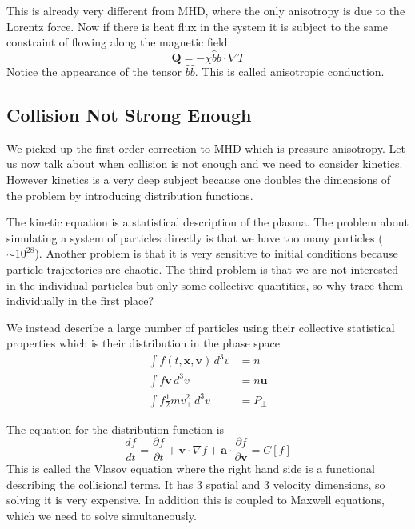 \documentclass[letterpaper, 11pt]{article}
\numberwithin{equation}{section}
\numberwithin{figure}{section}
\begin{document}
This is already very different from MHD, where the only anisotropy is due to the
Lorentz force. Now if there is heat flux in the system it is subject to the same
constraint of flowing along the magnetic field:
\begin{equation}
  \label{eq:36}
  \mathbf{Q} = -\chi \hat{b} \hat{b}\cdot\nabla T
\end{equation}
Notice the appearance of the tensor $\hat{b}\hat{b}$. This is called anisotropic
conduction.

\subsection{Collision Not Strong Enough}

We picked up the first order correction to MHD which is pressure anisotropy. Let
us now talk about when collision is not enough and we need to consider kinetics.
However kinetics is a very deep subject because one doubles the dimensions of
the problem by introducing distribution functions.

The kinetic equation is a statistical description of the plasma. The problem
about simulating a system of particles directly is that we have too many
particles ($\sim 10^{28}$). Another problem is that it is very sensitive to
initial conditions because particle trajectories are chaotic. The third problem
is that we are not interested in the individual particles but only some
collective quantities, so why trace them individually in the first place?

We instead describe a large number of particles using their collective
statistical properties which is their distribution in the phase space
\begin{align}
  \int f(t, \mathbf{x}, \mathbf{v})\,d^3v &= n \\
  \int f \mathbf{v}\,d^3v &= n \mathbf{u} \\
  \int f \frac{1}{2}m v_{\perp}^2\, d^{3}v &= P_{\perp}
\end{align}

The equation for the distribution function is
\begin{equation}
  \label{eq:37}
  \frac{df}{dt} = \frac{\partial f}{\partial t} + \mathbf{v}\cdot\nabla f + \mathbf{a}\cdot \frac{\partial f}{\partial \mathbf{v}} = C[f]
\end{equation}
This is called the Vlasov equation where the right hand side is a functional
describing the collisional terms. It has 3 spatial and 3 velocity dimensions, so
solving it is very expensive. In addition this is coupled to Maxwell equations,
which we need to solve simultaneously.
\end{document}
